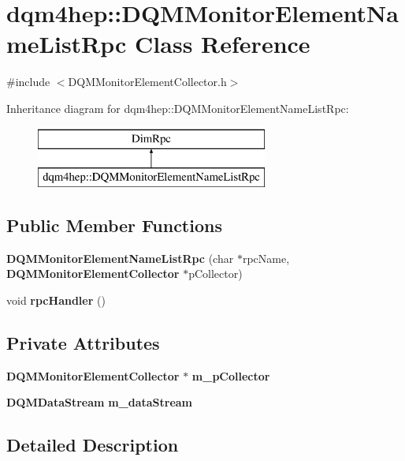 \section{dqm4hep\+:\+:D\+Q\+M\+Monitor\+Element\+Name\+List\+Rpc Class Reference}
\label{classdqm4hep_1_1DQMMonitorElementNameListRpc}


{\ttfamily \#include $<$D\+Q\+M\+Monitor\+Element\+Collector.\+h$>$}

Inheritance diagram for dqm4hep\+:\+:D\+Q\+M\+Monitor\+Element\+Name\+List\+Rpc\+:\begin{figure}[H]
\begin{center}
\leavevmode
\includegraphics[height=2.000000cm]{classdqm4hep_1_1DQMMonitorElementNameListRpc}
\end{center}
\end{figure}
\subsection*{Public Member Functions}
\begin{DoxyCompactItemize}
\item 
{\bf D\+Q\+M\+Monitor\+Element\+Name\+List\+Rpc} (char $\ast$rpc\+Name, {\bf D\+Q\+M\+Monitor\+Element\+Collector} $\ast$p\+Collector)
\item 
void {\bf rpc\+Handler} ()
\end{DoxyCompactItemize}
\subsection*{Private Attributes}
\begin{DoxyCompactItemize}
\item 
{\bf D\+Q\+M\+Monitor\+Element\+Collector} $\ast$ {\bf m\+\_\+p\+Collector}
\item 
{\bf D\+Q\+M\+Data\+Stream} {\bf m\+\_\+data\+Stream}
\end{DoxyCompactItemize}


\subsection{Detailed Description}


